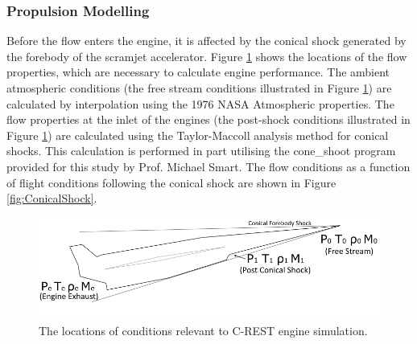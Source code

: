 \subsubsection{Propulsion Modelling}\label{sec:Propulsion}
Before the flow enters the engine, it is affected by the conical shock generated by the forebody of the scramjet accelerator.
Figure \ref{fig:SPARTANEngineshock} shows the locations of the flow properties, which are necessary to calculate engine performance. The ambient atmospheric conditions (the free stream conditions illustrated in Figure \ref{fig:SPARTANEngineshock}) are calculated by interpolation using the 1976 NASA Atmospheric properties\cite{Administration1976}.
The flow properties at the inlet of the engines (the post-shock conditions illustrated in Figure \ref{fig:SPARTANEngineshock}) are calculated using the Taylor-Maccoll analysis method for conical shocks\cite{TaylorMaccoll}. This calculation is performed in part utilising the \textsf{cone\_shoot} program provided for this study by Prof. Michael Smart. The flow conditions as a function of flight conditions following the conical shock are shown in Figure \ref{fig:ConicalShock}.  

\begin{figure}[ht]
	\centering
	\includegraphics[width=0.7\linewidth]{figures/3_vehicle_design/SPARTANEngineshock}
	\caption{The locations of conditions relevant to C-REST engine simulation. }
	\label{fig:SPARTANEngineshock}
\end{figure}

